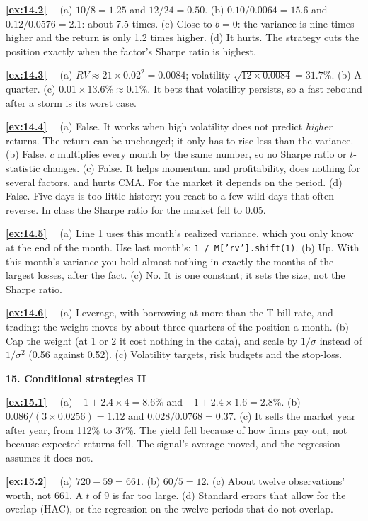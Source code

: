 \documentclass[11pt]{article}
\newcounter{ex}[section]
\newcommand{\sol}[1]{\par\smallskip\textbf{\ref{#1}}\ \ }
\newcommand{\head}[1]{\par\medskip\textbf{#1}\par}
\newcommand{\RV}{\mathit{RV}}
\begin{document}
{\sol{ex:14.2} (a) $10/8 = 1.25$ and $12/24 = 0.50$. (b) $0.10/0.0064 = 15.6$ and $0.12/0.0576 = 2.1$: about 7.5 times.
(c) Close to $b = 0$: the variance is nine times higher and the return is only 1.2 times higher. (d) It hurts. The
strategy cuts the position exactly when the factor's Sharpe ratio is highest.

\sol{ex:14.3} (a) $\RV \approx 21\times 0.02^{2} = 0.0084$; volatility $\sqrt{12\times 0.0084} = 31.7\%$. (b) A quarter. (c)
$0.01\times 13.6\% \approx 0.1\%$. It bets that volatility persists, so a fast rebound after a storm is its worst case.

\sol{ex:14.4} (a) False. It works when high volatility does not predict \emph{higher} returns. The return can be
unchanged; it only has to rise less than the variance. (b) False. $c$ multiplies every month by the same number, so no
Sharpe ratio or $t$-statistic changes. (c) False. It helps momentum and profitability, does nothing for several
factors, and hurts CMA. For the market it depends on the period. (d) False. Five days is too little history: you react
to a few wild days that often reverse. In class the Sharpe ratio for the market fell to 0.05.

\sol{ex:14.5} (a) Line 1 uses this month's realized variance, which you only know at the end of the month. Use last
month's: \texttt{1 / M['rv'].shift(1)}. (b) Up. With this month's variance you hold almost nothing in exactly the
months of the largest losses, after the fact. (c) No. It is one constant; it sets the size, not the Sharpe ratio.

\sol{ex:14.6} (a) Leverage, with borrowing at more than the T-bill rate, and trading: the weight moves by about three
quarters of the position a month. (b) Cap the weight (at 1 or 2 it cost nothing in the data), and scale by $1/\sigma$
instead of $1/\sigma^{2}$ (0.56 against 0.52). (c) Volatility targets, risk budgets and the stop-loss.

\head{15. Conditional strategies II}

\sol{ex:15.1} (a) $-1 + 2.4\times 4 = 8.6\%$ and $-1 + 2.4\times 1.6 = 2.8\%$. (b) $0.086/(3\times 0.0256) = 1.12$ and
$0.028/0.0768 = 0.37$. (c) It sells the market year after year, from 112\% to 37\%. The yield fell because of how firms
pay out, not because expected returns fell. The signal's average moved, and the regression assumes it does not.

\sol{ex:15.2} (a) $720 - 59 = 661$. (b) $60/5 = 12$. (c) About twelve observations' worth, not 661. A $t$ of 9 is far too
large. (d) Standard errors that allow for the overlap (HAC), or the regression on the twelve periods that do not
overlap.

}
\end{document}

